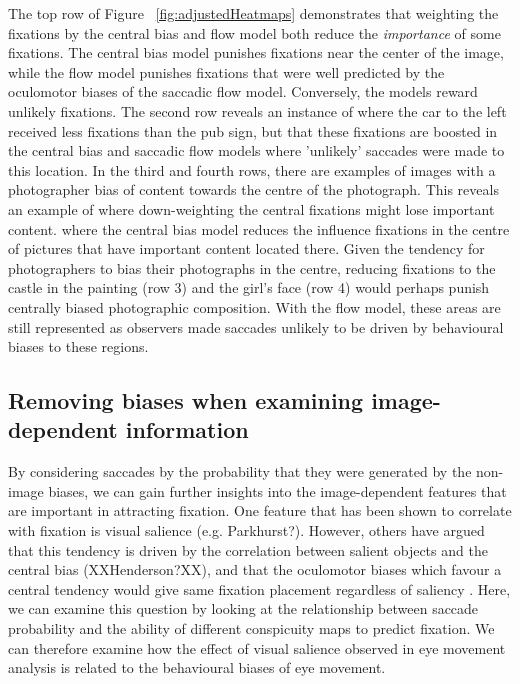 \documentclass[a4paper, twocolumn, oneside, 10pt]{article}
\begin{document}
The top row of Figure ~\ref{fig:adjustedHeatmaps} demonstrates that weighting the fixations by the central bias and flow model both reduce the \emph{importance} of some fixations. The central bias model punishes fixations near the center of the image, while the flow model punishes fixations that were well predicted by the oculomotor biases of the saccadic flow model. Conversely, the models reward unlikely fixations. The second row reveals an instance of where the car to the left received less fixations than the pub sign, but that these fixations are boosted in the central bias and saccadic flow models where 'unlikely' saccades were made to this location. In the third and fourth rows, there are examples of images with a photographer bias of content towards the centre of the photograph. This reveals an example of where down-weighting the central fixations might lose important content.
where the central bias model reduces the influence fixations in the centre of pictures that have important content located there. Given the tendency for photographers to bias their photographs in the centre, reducing fixations to the castle in the painting (row 3) and the girl's face (row 4) would perhaps punish centrally biased photographic composition. With the flow model, these areas are still represented as observers made saccades unlikely to be driven by behavioural biases to these regions.

\subsection{Removing biases when examining image-dependent information}

By considering saccades by the probability that they were generated by the non-image biases, we can gain further insights into the image-dependent features that are important in attracting fixation. One feature that has been shown to correlate with fixation is visual salience (e.g. Parkhurst?). However, others have argued that this tendency is driven by the correlation between salient objects and the central bias (XXHenderson?XX), and that the oculomotor biases which favour a central tendency would give same fixation placement regardless of saliency \citep{tatler-vincent2009}. Here, we can examine this question by looking at the relationship between saccade probability and the ability of different conspicuity maps to predict fixation. We can therefore examine how the effect of visual salience observed in eye movement analysis is related to the behavioural biases of eye movement.
\end{document}
